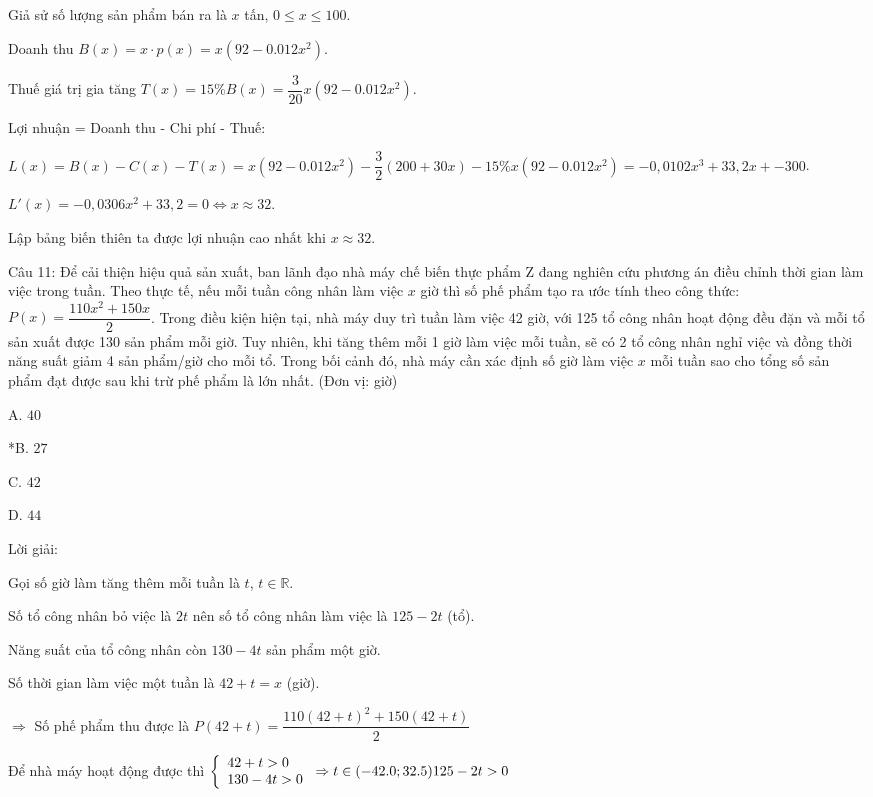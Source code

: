 \documentclass[a4paper,12pt]{article}
\begin{document}
Giả sử số lượng sản phẩm bán ra là \(x\) tấn, \(0 \leq x \leq 100\).

Doanh thu \(B(x) = x \cdot p(x) = x(92 - 0.012x^2)\).

Thuế giá trị gia tăng \(T(x) = 15\% B(x) = \dfrac{3}{20} x(92 - 0.012x^2)\).

Lợi nhuận = Doanh thu - Chi phí - Thuế:

\(L(x) = B(x) - C(x) - T(x) = x(92 - 0.012x^2) - \dfrac{3}{2}(200 + 30x) - 15\% x(92 - 0.012x^2) = -0,0102x^3 + 33,2x + -300\).

\(L'(x) = -0,0306x^2 + 33,2 = 0 \Leftrightarrow x \approx 32\).

Lập bảng biến thiên ta được lợi nhuận cao nhất khi \(x \approx 32\).




Câu 11: Để cải thiện hiệu quả sản xuất, ban lãnh đạo nhà máy chế biến thực phẩm Z đang nghiên cứu phương án điều chỉnh thời gian làm việc trong tuần. Theo thực tế, nếu mỗi tuần công nhân làm việc \(x\) giờ thì số phế phẩm tạo ra ước tính theo công thức: \( P(x) = \dfrac{110x^2 + 150x}{2} \). Trong điều kiện hiện tại, nhà máy duy trì tuần làm việc 42 giờ, với 125 tổ công nhân hoạt động đều đặn và mỗi tổ sản xuất được 130 sản phẩm mỗi giờ. Tuy nhiên, khi tăng thêm mỗi 1 giờ làm việc mỗi tuần, sẽ có 2 tổ công nhân nghỉ việc và đồng thời năng suất giảm 4 sản phẩm/giờ cho mỗi tổ. Trong bối cảnh đó, nhà máy cần xác định số giờ làm việc \(x\) mỗi tuần sao cho tổng số sản phẩm đạt được sau khi trừ phế phẩm là lớn nhất. (Đơn vị: giờ)

A. \(40\)

*B. \(27\)

C. \(42\)

D. \(44\)

Lời giải:


Gọi số giờ làm tăng thêm mỗi tuần là \(t\), \(t \in \mathbb{R}\).

Số tổ công nhân bỏ việc là \(2 t\) nên số tổ công nhân làm việc là \(125 - 2 t\) (tổ).

Năng suất của tổ công nhân còn \(130 - 4 t\) sản phẩm một giờ.

Số thời gian làm việc một tuần là \(42 + t = x\) (giờ).

\(\Rightarrow\) Số phế phẩm thu được là \(P(42 + t) = \dfrac{110(42 + t)^2 + 150(42 + t)}{2}\)

Để nhà máy hoạt động được thì \(\left\{\begin{array}{l}42 + t > 0 \\ 130 - 4 t > 0\end{array}\right. \Rightarrow t \in(-42.0 ; 32.5) \\ 125 - 2 t > 0\)
\end{document}
